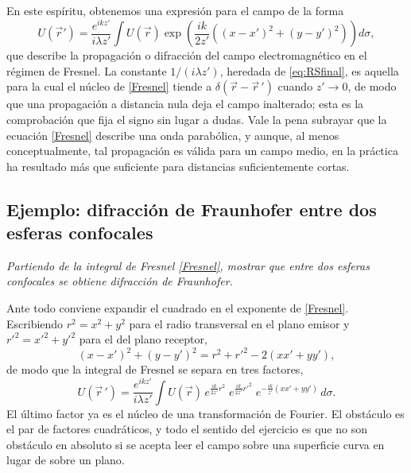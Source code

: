 En este espíritu, obtenemos una expresión para el campo de la forma
\begin{equation}
	\label{Fresnel}
	U(\vec{r}') = \dfrac{e^{ikz'}}{i\lambda z'} \int U(\vec{r}) \exp \left(\dfrac{ik}{2z'} ((x-x')^2 + (y-y')^2) \right) d\sigma,
\end{equation}
que describe la propagación o difracción del campo electromagnético en el régimen de Fresnel. La constante $1/(i\lambda z')$, heredada de \eqref{eq:RSfinal}, es aquella para la cual el núcleo de \eqref{Fresnel} tiende a $\delta(\vec{r}-\vec{r}\,')$ cuando $z'\to 0$, de modo que una propagación a distancia nula deja el campo inalterado; esta es la comprobación que fija el signo sin lugar a dudas. Vale la pena subrayar que la ecuación \eqref{Fresnel} describe una onda parabólica, y aunque, al menos conceptualmente, tal propagación es válida para un campo medio, en la práctica ha resultado más que suficiente para distancias suficientemente cortas.

	\subsection{Ejemplo: difracción de Fraunhofer entre dos esferas confocales}

		\textit{Partiendo de la integral de Fresnel \eqref{Fresnel}, mostrar que entre dos esferas confocales se obtiene difracción de Fraunhofer.}

		Ante todo conviene expandir el cuadrado en el exponente de \eqref{Fresnel}. Escribiendo $r^{2} = x^{2}+y^{2}$ para el radio transversal en el plano emisor y $r'^{2} = x'^{2}+y'^{2}$ para el del plano receptor,
		\begin{equation}\label{eq:ExpandFresnelSquare}
			(x-x')^{2} + (y-y')^{2} = r^{2} + r'^{2} - 2\left(xx'+yy'\right),
		\end{equation}
		de modo que la integral de Fresnel se separa en tres factores,
		\begin{equation}\label{eq:FresnelThreeFactors}
			U(\vec{r}\,') = \dfrac{e^{ikz'}}{i\lambda z'}\int U(\vec{r})\,
			e^{\frac{ik}{2z'}r^{2}}\;
			e^{\frac{ik}{2z'}r'^{2}}\;
			e^{-\frac{ik}{z'}\left(xx'+yy'\right)}\,d\sigma .
		\end{equation}
		El último factor ya es el núcleo de una transformación de Fourier. El obstáculo es el par de factores cuadráticos, y todo el sentido del ejercicio es que no son obstáculo en absoluto si se acepta leer el campo sobre una superficie curva en lugar de sobre un plano.

